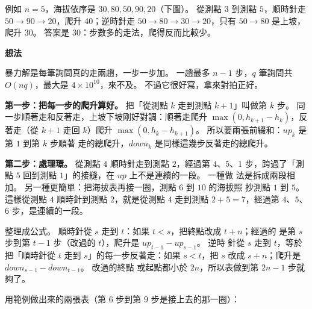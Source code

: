 例如 $n = 5$，海拔依序是 $30, 80, 50, 90, 20$（下圖）。 從測點 $3$ 到測點
$5$，順時針走 $50 \to 90 \to 20$，爬升 $40$；逆時針走
$50 \to 80 \to 30 \to 20$，只有 $50 \to 80$ 是上坡，爬升 $30$。 答案是
$30$：步數多的走法，爬得反而比較少。

\begin{center}
\label{fig:ps-lake}
\end{center}

\textbf{想法}

暴力解是每筆詢問真的走兩趟，一步一步加。 一趟最多 $n - 1$ 步，$q$ 筆詢問共
$O(nq)$，最大是 $4 \times 10^{10}$，來不及。 不過它很好寫，拿來對拍正好。

\textbf{第一步：把每一步的爬升算好。} 把「從測點 $k$ 走到測點 $k + 1$」叫做第
$k$ 步。 同一步順著走和反著走，上坡下坡剛好對調：順著走爬升
$\max(0, h_{k+1} - h_k)$，反著走（從 $k + 1$ 走回 $k$）爬升
$\max(0, h_k - h_{k+1})$。 所以要兩張前綴和：$up_k$ 是第 $1$ 到第 $k$ 步順著
走的總爬升，$down_k$ 是同樣這幾步反著走的總爬升。

\textbf{第二步：處理環。} 從測點 $4$ 順時針走到測點 $2$，經過第 $4$、$5$、$1$
步，跨過了「測點 $5$ 回到測點 $1$」的接縫，在 $up$ 上不是連續的一段。 一種做
法是拆成兩段相加。 另一種更簡單：把海拔表再接一圈，測點 $6$ 到 $10$ 的海拔照
抄測點 $1$ 到 $5$。 這樣從測點 $4$ 順時針到測點 $2$，就是從測點 $4$ 走到測點
$2 + 5 = 7$，經過第 $4$、$5$、$6$ 步，是連續的一段。

整理成公式。 順時針從 $s$ 走到 $t$：如果 $t < s$，把終點改成 $t + n$；經過的
是第 $s$ 步到第 $t - 1$ 步（改過的 $t$），爬升是 $up_{t-1} - up_{s-1}$。 逆時
針從 $s$ 走到 $t$，等於把「順時針從 $t$ 走到 $s$」的每一步反著走：如果
$s < t$，把 $s$ 改成 $s + n$；爬升是 $down_{s-1} - down_{t-1}$。 改過的終點
或起點都小於 $2n$，所以表做到第 $2n - 1$ 步就夠了。

用範例做出來的兩張表（第 $6$ 步到第 $9$ 步是接上去的那一圈）：

